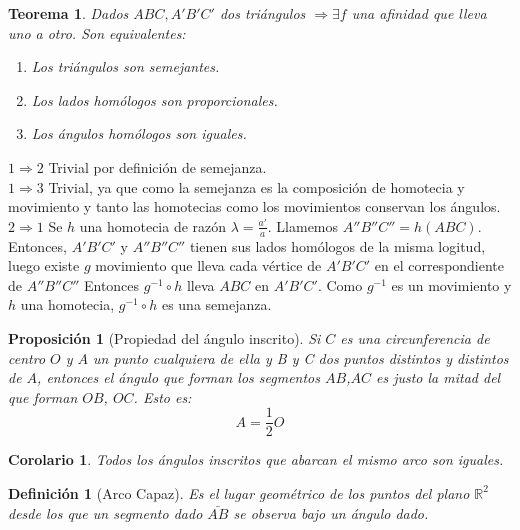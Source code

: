 \documentclass[11pt, a4paper, titlepage]{article}
\makeatletter
\renewenvironment{proof}[1][\proofname] {\vspace{-15pt}\par\pushQED{\qed}\normalfont\topsep6\p@\@plus6\p@\relax\trivlist\item[\hskip\labelsep\it#1\@addpunct{.}]\ignorespaces}{\popQED\endtrivlist\@endpefalse}
\newcommand{\R}{\mathbb{R}}
\renewenvironment{proof}[1][\proofname] {\par\pushQED{\qed}\normalfont\topsep6\p@\@plus6\p@\relax\trivlist\item[\hskip\labelsep\itshape\sffamily#1\@addpunct{.}]\ignorespaces}{\popQED\endtrivlist\@endpefalse}
\theoremstyle{theorem-style}
\newtheorem{nth}{Teorema}[section]
\newtheorem{nprop}{Proposición}[section]
\newtheorem{ncor}{Corolario}[section]
\theoremstyle{definition-style}
\newtheorem{ndef}{Definición}[section]
\theoremstyle{remark-style}
\theoremstyle{example-style}
\makeatother
\begin{document}
\begin{nth}
  Dados $ABC, A'B'C'$ dos triángulos $\Rightarrow \exists f$ una afinidad que lleva uno a otro. Son equivalentes:
  \begin{enumerate}
  \item Los triángulos son semejantes.
  \item Los lados homólogos son proporcionales.
  \item Los ángulos homólogos son iguales.
  \end{enumerate}	
\end{nth}

\begin{proof} \hfill 

  $\boxed{1 \Rightarrow 2}$ Trivial por definición de semejanza.\\
  $\boxed{1 \Rightarrow 3}$ Trivial, ya que como la semejanza es la composición de homotecia y movimiento y tanto las homotecias como los movimientos conservan los ángulos.\\
  $\boxed{2 \Rightarrow 1}$ Se $h$ una homotecia de razón $\lambda = \frac{a'}{a}$. Llamemos $A''B''C'' = h(ABC)$. Entonces, $A'B'C'$ y $A''B''C''$ tienen sus lados homólogos de la misma logitud, luego existe $g$ movimiento que lleva cada vértice de $A'B'C'$ en el correspondiente de $A''B''C''$ Entonces $g^{-1} \circ h$ lleva $ABC$ en $	A'B'C'$. Como $g^{-1}$ es un movimiento y $h$ una homotecia, $g^{-1} \circ h$ es una semejanza.
\end{proof}


\begin{nprop}[Propiedad del ángulo inscrito]
  Si $C$ es una circunferencia de centro $O$ y $A$ un punto cualquiera de ella y B y C dos puntos distintos y distintos de $A$, entonces el ángulo que forman los segmentos $AB$,$AC$ es justo la mitad del que forman $OB$, $OC$. Esto es:
  \[
    A = \dfrac{1}{2} O
  \]
\end{nprop}
\begin{ncor}
  Todos los ángulos inscritos que abarcan el mismo arco son iguales.
\end{ncor}

\begin{ndef}[Arco Capaz]
	Es el lugar geométrico de los puntos del plano $\R^2$ desde los que un segmento dado $\bar{AB}$ se observa bajo un ángulo dado.
\end{ndef}
\end{document}
